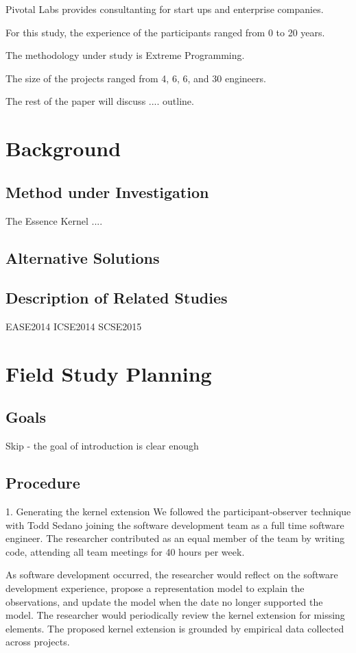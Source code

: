 \documentclass[preprint,12pt,3p]{elsarticle}
\begin{document}
Pivotal Labs provides consultanting for start ups and enterprise companies.

For this study, the experience of the participants ranged from 0 to 20 years.

The methodology under study is Extreme Programming.

The size of the projects ranged from 4, 6, 6, and 30 engineers.

The rest of the paper will discuss .... outline.


\section{Background}

\subsection{Method under Investigation}
The Essence Kernel ....

\subsection{Alternative Solutions}

\subsection{Description of Related Studies}

EASE2014
ICSE2014
SCSE2015

\section{Field Study Planning} 

\subsection{Goals}
Skip - the goal of introduction is clear enough

\subsection{Procedure}
1. Generating the kernel extension
We followed the participant-observer technique with Todd Sedano joining the software development team as a full time software engineer. The researcher contributed as an equal member of the team by writing code, attending all team meetings for 40 hours per week. 

As software development occurred, the researcher would reflect on the software development experience, propose a representation model to explain the observations, and update the model when the date no longer supported the model.  The researcher would periodically review the kernel extension for missing elements. The proposed kernel extension is grounded by empirical data collected across projects. 
\end{document}
